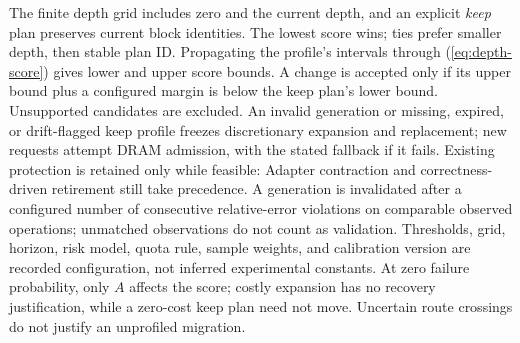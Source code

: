 The finite depth grid includes zero and the current depth, and an explicit
\emph{keep} plan preserves current block identities. The lowest score wins;
ties prefer smaller depth, then stable plan ID. Propagating the profile's
intervals through (\ref{eq:depth-score}) gives lower and upper score bounds.
A change is accepted only if its upper bound plus a configured margin
is below the keep plan's lower bound. Unsupported candidates are excluded.
An invalid generation or missing, expired, or drift-flagged keep profile
freezes discretionary expansion and replacement; new requests attempt
DRAM admission, with the stated fallback if it fails.
Existing protection is retained only while feasible:
Adapter contraction and correctness-driven retirement still take precedence.
A generation is invalidated after a configured number of consecutive
relative-error violations on comparable observed operations; unmatched
observations do not count as validation. Thresholds, grid, horizon,
risk model, quota rule, sample weights, and calibration version are
recorded configuration, not inferred experimental constants.
At zero failure probability, only $A$ affects the score; costly expansion
has no recovery justification, while a zero-cost keep plan need not move.
Uncertain route crossings do not justify an unprofiled migration.

